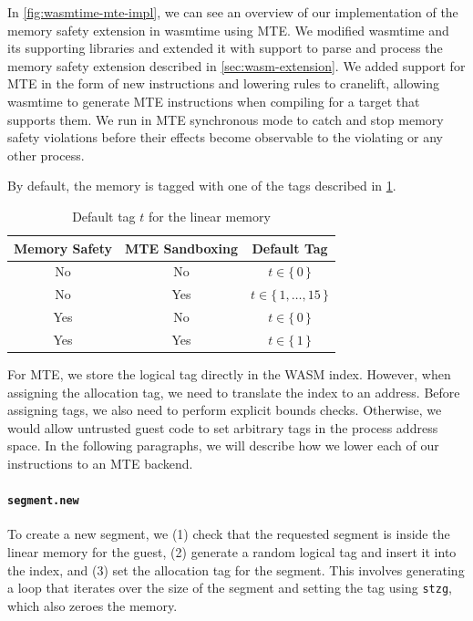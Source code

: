 In \cref{fig:wasmtime-mte-impl}, we can see an overview of our implementation of the memory safety extension in wasmtime using \ac{MTE}.
We modified wasmtime and its supporting libraries and extended it with support to parse and process the memory safety extension described in \cref{sec:wasm-extension}.
We added support for \ac{MTE} in the form of new instructions and lowering rules to cranelift, allowing wasmtime to generate \ac{MTE} instructions when compiling for a target that supports them.
We run in \ac{MTE} synchronous mode to catch and stop memory safety violations before their effects become observable to the violating or any other process.

By default, the memory is tagged with one of the tags described in \cref{tab:default-tag}.

\begin{table}
  \centering
  \begin{tabular}{c | c || c}
    \textbf{Memory Safety} & \textbf{MTE Sandboxing} & \textbf{Default Tag} \\
    \hline
    No  & No  & $t \in \{\,0\,\}$ \\
    No  & Yes & $t \in \{\,1, \dots, 15\,\}$ \\
    Yes & No  & $t \in \{\,0\,\}$ \\
    Yes & Yes & $t \in \{\,1\,\}$
  \end{tabular}
  \caption{Default tag $t$ for the linear memory}
  \label{tab:default-tag}
\end{table}

For \ac{MTE}, we store the logical tag directly in the \ac{WASM} index.
However, when assigning the allocation tag, we need to translate the index to an address.
Before assigning tags, we also need to perform explicit bounds checks. Otherwise, we would allow untrusted guest code to set arbitrary tags in the process address space.
In the following paragraphs, we will describe how we lower each of our instructions to an \ac{MTE} backend.

\paragraph{\texttt{segment.new}} To create a new segment, we (1) check that the requested segment is inside the linear memory for the guest, (2) generate a random logical tag and insert it into the index, and (3) set the allocation tag for the segment.
This involves generating a loop that iterates over the size of the segment and setting the tag using \texttt{stzg}, which also zeroes the memory.

